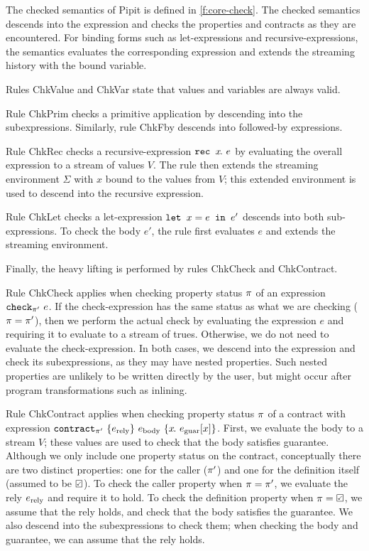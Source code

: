 

The checked semantics of Pipit is defined in \autoref{f:core-check}.
The checked semantics descends into the expression and checks the properties and contracts as they are encountered.
For binding forms such as let-expressions and recursive-expressions, the semantics evaluates the corresponding expression and extends the streaming history with the bound variable.

Rules {\sc ChkValue} and {\sc ChkVar} state that values and variables are always valid.

Rule {\sc ChkPrim} checks a primitive application by descending into the subexpressions.
Similarly, rule {\sc ChkFby} descends into followed-by expressions.

Rule {\sc ChkRec} checks a recursive-expression $\texttt{rec~} x\hspace{-0.1em}.~e$ by evaluating the overall expression to a stream of values $V$.
The rule then extends the streaming environment $\Sigma$ with $x$ bound to the values from $V$; this extended environment is used to descend into the recursive expression.

Rule {\sc ChkLet} checks a let-expression $\texttt{let~} x = e \texttt{~in~} e'$ descends into both sub-expressions.
To check the body $e'$, the rule first evaluates $e$ and extends the streaming environment.

Finally, the heavy lifting is performed by rules {\sc ChkCheck} and {\sc ChkContract}.

Rule {\sc ChkCheck} applies when checking property status $\pi$ of an expression $\texttt{check}_{\pi'}~e$.
If the check-expression has the same status as what we are checking ($\pi = \pi'$), then we perform the actual check by evaluating the expression $e$ and requiring it to evaluate to a stream of trues.
Otherwise, we do not need to evaluate the check-expression.
In both cases, we descend into the expression and check its subexpressions, as they may have nested properties.
Such nested properties are unlikely to be written directly by the user, but might occur after program transformations such as inlining.

Rule {\sc ChkContract} applies when checking property status $\pi$ of a contract with expression $\texttt{contract}_{\pi'}~\{e_{\text{rely}}\}~e_{\text{body}}~\{x\hspace{-0.1em}.~e_{\text{guar}}[x]\}$.
First, we evaluate the body to a stream $V$; these values are used to check that the body satisfies guarantee.
Although we only include one property status on the contract, conceptually there are two distinct properties: one for the caller ($\pi'$) and one for the definition itself (assumed to be $\PSValid$).
To check the caller property when $\pi = \pi'$, we evaluate the rely $e_{\text{rely}}$ and require it to hold.
To check the definition property when $\PStatus = \PSValid$, we assume that the rely holds, and check that the body satisfies the guarantee.
We also descend into the subexpressions to check them; when checking the body and guarantee, we can assume that the rely holds.

